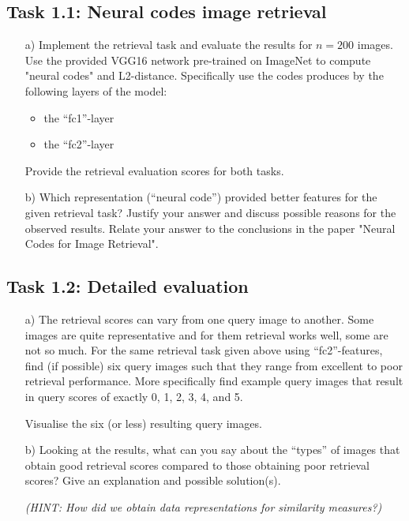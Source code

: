 \documentclass[a4paper,twoside,10pt]{article}
\begin{document}
\subsection*{Task 1.1: Neural codes image retrieval}
\begin{itemize}
  \item[a)] Implement the retrieval task and evaluate the results for $n=200$ images. Use the provided VGG16 network pre-trained on ImageNet to compute "neural codes" and L2-distance. Specifically use the codes produces by the following layers of the model:
  \begin{itemize}
    \item the ``fc1''-layer
	\item the ``fc2''-layer
  \end{itemize}
  Provide the retrieval evaluation scores for both tasks.
  \item[b)] Which representation (``neural code'') provided better features for the given retrieval task? Justify your answer and discuss possible reasons for the observed results. Relate your answer to the conclusions in the paper "Neural Codes for Image Retrieval".
\end{itemize}

\subsection*{Task 1.2: Detailed evaluation}
\begin{itemize}
  \item[a)] The retrieval scores can vary from one query image to another. Some images are quite representative and for them retrieval works well, some are not so much. For the same retrieval task given above using ``fc2''-features, find (if possible) six query images such that they range from excellent to poor retrieval performance. More specifically find example query images that result in query scores of exactly 0, 1, 2, 3, 4, and 5.

Visualise the six (or less) resulting query images.
  \item[b)] Looking at the results, what can you say about the ``types'' of images that obtain good retrieval scores compared to those obtaining poor retrieval scores? Give an explanation and possible solution(s).

\emph{(HINT: How did we obtain data representations for similarity measures?)}
\end{itemize}
\end{document}
